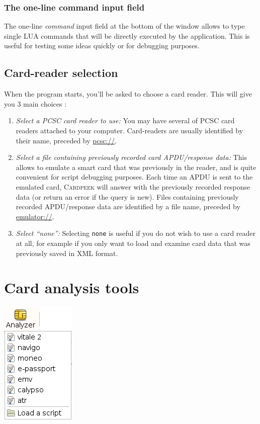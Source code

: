 \documentclass[11pt]{report}
\newcommand{\Cardpeek}{\textsc{Cardpeek}}
\begin{document}
\subsection{The one-line command input field}

The one-line \emph{command} input field at the bottom of the window allows to type single LUA commands that will be 
directly executed by the application.
This is useful for testing some ideas quickly or for debugging purposes.

\section{Card-reader selection}

When the program starts, you'll be asked to choose a card reader. 
This will give you 3 main choices :
\begin{enumerate}
\item{\emph{Select a PCSC card reader to use:}
  You may have several of PCSC card readers attached to your computer.
      	  Card-readers are usually identified by their name, preceded by \url{pcsc://}.}
\item{\emph{Select a file containing previously recorded card APDU/response data:}
  This allows to emulate a smart card that was previously in the reader, and is quite convenient
  for script debugging purposes.
  Each time an APDU is sent to the emulated card, \Cardpeek{} will answer with the previously 
  recorded response data (or return an error if the query is new).
  Files containing previously recorded APDU/response data are identified by a file name, preceded by 
  \url{emulator://}.}
\item{\emph{Select ``none'':}
  Selecting \texttt{none} is useful if you do not wish to use a card reader at all, for example if 
  you only want to load and examine card data that was previously saved in XML format.}
\end{enumerate}

\chapter{Card analysis tools}

\begin{center}
\includegraphics[width=.25\textwidth]{graphics/sample-menu-analyzer.png}
\end{center}
\end{document}
